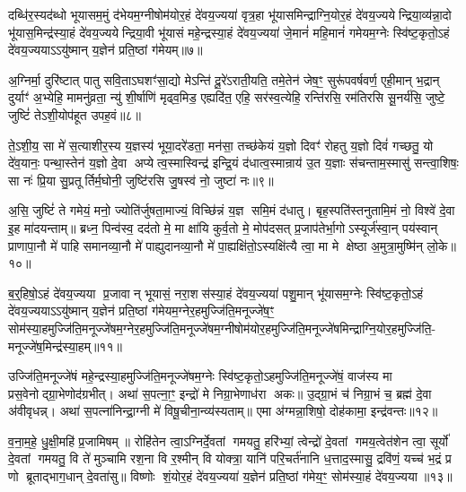 दब्धि॑र॒स्यद॑ब्धो भूयासम॒मुं द॑भेयम॒ग्नीषोम॑योर॒हं दे॑वय॒ज्यया॑ वृत्र॒हा भू॑यासमिन्द्राग्नि॒योर॒हं दे॑वय॒ज्ययेन्द्रिया॒व्य॑न्ना॒दो भू॑यास॒मिन्द्र॑स्या॒हं दे॑वय॒ज्ययेन्द्रिया॒वी भू॑यासं महे॒न्द्रस्या॒हं दे॑वय॒ज्यया॑ जे॒मानं॑ महि॒मानं॑ गमेयम॒ग्नेः स्वि॑ष्ट॒कृतो॒ऽहं दे॑वय॒ज्ययाऽऽयु॑ष्मान् य॒ज्ञेन॑ प्रति॒ष्ठां ग॑मेयम्॥७॥

{\anuvakamend[{रिष्यात् सपत्न॒क्षय॑ण्यन्ना॒दो भू॑यास॒ꣳ॒ षट्त्रिꣳ॑शच्च॥२॥}]}

अ॒ग्निर्मा॒ दुरि॑ष्टात् पातु सवि॒ताऽघशꣳ॑सा॒द्यो मेऽन्ति॑ दू॒रे॑ऽराती॒यति॒ तमे॒तेन॑ जेष॒ꣳ॒ सुरू॑पवर्\mbox{}षवर्ण॒ एही॒मान् भ॒द्रान् दुर्याꣳ॑ अ॒भ्येहि॒ मामनु॑व्रता॒ न्यु॑ शी॒र्\mbox{}षाणि॑ मृढ्व॒मिड॒ एह्यदि॑त॒ एहि॒ सर॑स्व॒त्येहि॒ रन्ति॑रसि॒ रम॑तिरसि सू॒नर्य॑सि॒ जुष्टे॒ जुष्टिं॑ तेऽशी॒योप॑हूत उपह॒वं॥८॥

ते॒ऽशी॒य॒ सा मे॑ स॒त्याशीर॒स्य य॒ज्ञस्य॑ भूया॒दरे॑डता॒ मन॑सा॒ तच्छ॑केयं य॒ज्ञो दिवꣳ॑ रोहतु य॒ज्ञो दिवं॑ गच्छतु॒ यो दे॑व॒यानः॒ पन्था॒स्तेन॑ य॒ज्ञो दे॒वा अप्येत्व॒स्मास्विन्द्र॑ इन्द्रि॒यं द॑धात्व॒स्मान्राय॑ उ॒त य॒ज्ञाः स॑चन्ताम॒स्मासु॑ सन्त्वा॒शिषः॒ सा नः॑ प्रि॒या सु॒प्रतूर्तिर्म॒घोनी॒ जुष्टि॑रसि जु॒षस्व॑ नो॒ जुष्टा॑ नः॥९॥

अ॒सि॒ जुष्टिं॑ ते गमेयं॒ मनो॒ ज्योति॑र्जुषता॒माज्यं॒ विच्छि॑न्नं य॒ज्ञ समि॒मं द॑धातु। बृह॒स्पति॑स्तनुतामि॒मं नो॒ विश्वे॑ दे॒वा इ॒ह मा॑दयन्ताम्॥ ब्रध्न॒ पिन्व॑स्व॒ दद॑तो मे॒ मा क्षा॑यि कुर्व॒तो मे॒ मोप॑दसत् प्र॒जाप॑तेर्भा॒गोऽस्यूर्ज॑स्वा॒न् पय॑स्वान् प्राणापा॒नौ मे॑ पाहि समानव्या॒नौ मे॑ पाह्युदानव्या॒नौ मे॑ पा॒ह्यक्षि॑तो॒ऽस्यक्षि॑त्यै त्वा॒ मा मे क्षेष्ठा अ॒मुत्रा॒मुष्मि॑न् लो॒के॥१०॥

{\anuvakamend[{उ॒प॒ह॒वं जुष्टा॑ नस्त्वा॒ षट् च॑॥३॥}]}

ब॒र्॒\mbox{}हिषो॒ऽहं दे॑वय॒ज्यया प्र॒जावान् भूयासं॒ नरा॒शस॑स्या॒हं दे॑वय॒ज्यया॑ पशु॒मान् भू॑यासम॒ग्नेः स्वि॑ष्ट॒कृतो॒ऽहं दे॑वय॒ज्ययाऽऽयु॑ष्मान् य॒ज्ञेन॑ प्रति॒ष्ठां ग॑मेयम॒ग्नेर॒हमुज्जि॑ति॒मनूज्जे॑ष॒ꣳ॒ सोम॑स्या॒हमुज्जि॑ति॒मनूज्जे॑षम॒ग्नेर॒हमुज्जि॑ति॒मनूज्जे॑षम॒ग्नीषोम॑योर॒हमुज्जि॑ति॒मनूज्जे॑षमिन्द्राग्नि॒योर॒हमुज्जि॑ति॒- मनूज्जे॑ष॒मिन्द्र॑स्या॒हम्॥११॥

उज्जि॑ति॒मनूज्जे॑षं महे॒न्द्रस्या॒हमुज्जि॑ति॒मनूज्जे॑षम॒ग्नेः स्वि॑ष्ट॒कृतो॒ऽहमुज्जि॑ति॒मनूज्जे॑षं॒ वाज॑स्य मा प्रस॒वेनोद्ग्रा॒भेणोद॑ग्रभीत्। अथा॑ स॒पत्ना॒ꣳ॒ इन्द्रो॑ मे निग्रा॒भेणाध॑रा अकः॥ उ॒द्ग्रा॒भं च॑ निग्रा॒भं च॒ ब्रह्म॑ दे॒वा अ॑वीवृधन्न्। अथा॑ स॒पत्ना॑निन्द्रा॒ग्नी मे॑ विषू॒चीना॒न्व्य॑स्यताम्॥ एमा अ॑ग्मन्ना॒शिषो॒ दोह॑कामा॒ इन्द्र॑वन्तः॥१२॥

व॒ना॒म॒हे॒ धु॒क्षी॒महि॑ प्र॒जामिषम्॥ रोहि॑तेन त्वा॒ऽग्निर्दे॒वतां गमयतु॒ हरि॑भ्यां॒ त्वेन्द्रो॑ दे॒वतां गमय॒त्वेत॑शेन त्वा॒ सूर्यो॑ दे॒वतां गमयतु॒ वि ते॑ मुञ्चामि रश॒ना वि र॒श्मीन् वि योक्त्रा॒ यानि॑ परि॒चर्त॑नानि ध॒त्ताद॒स्मासु॒ द्रवि॑णं॒ यच्च॑ भ॒द्रं प्र णो ब्रूताद्भाग॒धान् दे॒वता॑सु॥ विष्णोः शं॒योर॒हं दे॑वय॒ज्यया॑ य॒ज्ञेन॑ प्रति॒ष्ठां ग॑मेय॒ꣳ॒ सोम॑स्या॒हं दे॑वय॒ज्यया॥१३॥

